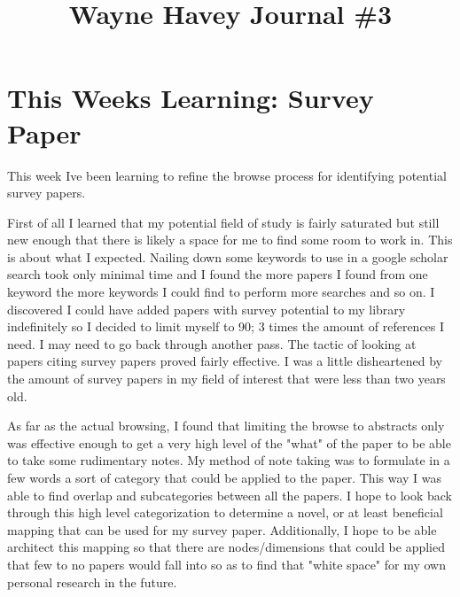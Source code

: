 \documentclass[conference]{IEEEtran}
\begin{document}
\title{Wayne Havey Journal \#3\\
}

\author{
}

\maketitle

\section{This Weeks Learning: Survey Paper}
This week Ive been learning to refine the browse process for identifying potential survey papers. 
\vspace{5mm}

First of all I learned that my potential field of study is fairly saturated but still new enough that there is likely a space for me to find some room to work in. This is about what I expected. Nailing down some keywords to use in a google scholar search took only minimal time and I found the more papers I found from one keyword the more keywords I could find to perform more searches and so on. I discovered I could have added papers with survey potential to my library indefinitely so I decided to limit myself to 90; 3 times the amount of references I need. I may need to go back through another pass. The tactic of looking at papers citing survey papers proved fairly effective. I was a little disheartened by the amount of survey papers in my field of interest that were less than two years old. 
\vspace{5mm}

As far as the actual browsing, I found that limiting the browse to abstracts only was effective enough to get a very high level of the "what" of the paper to be able to take some rudimentary notes. My method of note taking was to formulate in a few words a sort of category that could be applied to the paper. This way I was able to find overlap and subcategories between all the papers. I hope to look back through this high level categorization to determine a novel, or at least beneficial mapping that can be used for my survey paper. Additionally, I hope to be able architect this mapping so that there are nodes/dimensions that could be applied that few to no papers would fall into so as to find that "white space" for my own personal research in the future. 
\end{document}
